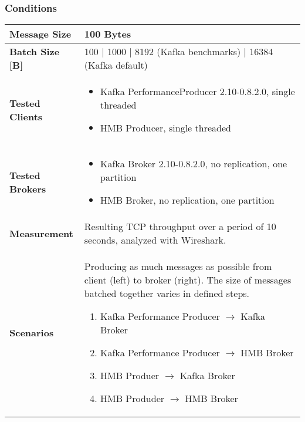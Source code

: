 \subsubsection{Conditions}
\begin{table}[H]
\begin{tabular}{|l| p{12cm}|} \hline
{\bf Message Size}   & 100 Bytes \\ \hline
{\bf Batch Size [B]} & 100 | 1000 | 8192 (Kafka benchmarks) | 16384 (Kafka default) \\ \hline
{\bf Tested Clients} &
    \begin{itemize}
        \item Kafka PerformanceProducer 2.10-0.8.2.0, single threaded
        \item HMB Producer, single threaded
    \end{itemize}\\ \hline
{\bf Tested Brokers} &
    \begin{itemize}
        \item Kafka Broker 2.10-0.8.2.0, no replication, one partition
        \item HMB Broker, no replication, one partition
    \end{itemize}\\ \hline
{\bf Measurement} & Resulting TCP throughput over a period of 10 seconds, analyzed with
    Wireshark. \\ \hline
{\bf Scenarios} & Producing as much messages as possible from client (left) to broker (right).
    The size of messages batched together varies in defined steps.
    \begin{enumerate}
        \item Kafka Performance Producer $\rightarrow$ Kafka Broker
        \item Kafka Performance Producer $\rightarrow$ HMB Broker
        \item HMB Produer $\rightarrow$ Kafka Broker
        \item HMB Produder $\rightarrow$ HMB Broker
    \end{enumerate} \\ \hline
\end{tabular}
\end{table}

